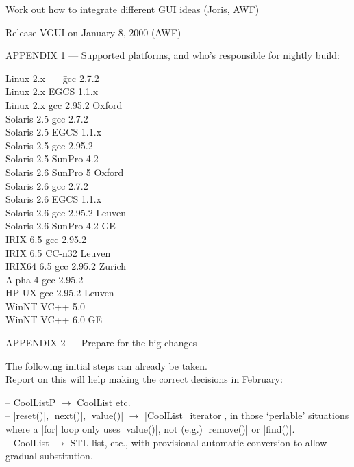 \documentclass[11pt]{article}
\begin{document}
Work out how to integrate different GUI ideas (Joris, AWF)

Release VGUI on January 8, 2000 (AWF)

\newpage


APPENDIX 1 --- Supported platforms, and who's responsible for nightly build:

  \begin{tabbing}

Linux 2.x ~~~\=	gcc 2.7.2 ~~~~~~ \=		\\
Linux 2.x \>	EGCS 1.1.x	 \>		\\
Linux 2.x \>	gcc 2.95.2	 \>	Oxford	\\
Solaris 2.5 \>	gcc 2.7.2	 \>		\\
Solaris 2.5 \>	EGCS 1.1.x	 \>		\\
Solaris 2.5 \>	gcc 2.95.2	 \>		\\
Solaris 2.5 \>	SunPro 4.2	 \>		\\
Solaris 2.6 \>	SunPro 5	 \>	Oxford	\\
Solaris 2.6 \>	gcc 2.7.2	 \>		\\
Solaris 2.6 \>	EGCS 1.1.x	 \>		\\
Solaris 2.6 \>	gcc 2.95.2	 \>	Leuven	\\
Solaris 2.6 \>	SunPro 4.2	 \>	GE	\\
IRIX 6.5 \>	gcc 2.95.2	 \>		\\
IRIX 6.5 \>	CC-n32  	 \>	Leuven	\\
IRIX64 6.5 \>	gcc 2.95.2	 \>	Zurich	\\
Alpha 4 \>	gcc 2.95.2	 \>		\\
HP-UX \>	gcc 2.95.2	 \>	Leuven	\\
WinNT \>	VC++ 5.0	 \>		\\
WinNT \>	VC++ 6.0	 \>	GE	\\

  \end{tabbing}

APPENDIX 2 --- Prepare for the big changes

The following initial steps can already be taken. \\
Report on this will help making the correct decisions in February:

-- CoolListP $\rightarrow$ CoolList etc. \\
-- |reset()|, |next()|, |value()| $\rightarrow$ |CoolList_iterator|, in
those `perlable' situations where a |for| loop only uses |value()|, not (e.g.)
|remove()| or |find()|. \\
-- CoolList $\rightarrow$ STL list, etc., with provisional automatic conversion
to allow gradual substitution.
\end{document}

